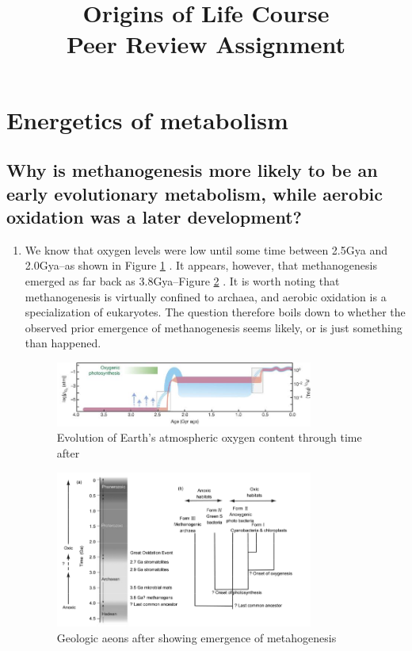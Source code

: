 \documentclass[]{article}
\title{
	Origins of Life Course\\
	Peer Review Assignment
}
\begin{document}
\maketitle

\tableofcontents

\section{Energetics of metabolism}

\subsection{
	Why is methanogenesis more likely to be an early evolutionary metabolism, while aerobic oxidation was a later development?
}

\begin{enumerate}
	\item We know that oxygen levels were low until some time between 2.5Gya and 2.0Gya--as shown in Figure \ref{fig:nature13068-f1} \cite{lyons2014rise}.  It appears, however, that methanogenesis emerged as far back as 3.8Gya--Figure \ref{fig:nisbet2011evolution} \cite{nisbet2011evolution}. It is worth noting that methanogenesis is virtually confined to archaea\cite{angel2012methanogenic}, and aerobic oxidation is a specialization of eukaryotes. The question therefore boils down to whether the observed prior emergence of methanogenesis seems likely, or is just something than happened.
	\begin{figure}[H]
		\caption{Evolution of Earth’s atmospheric oxygen content through time after \cite{lyons2014rise} }\label{fig:nature13068-f1}
		\includegraphics[width=0.8\textwidth]{nature13068-f1}
	\end{figure}
	
	\begin{figure}[H]
		\caption{Geologic aeons after \cite{nisbet2011evolution} showing emergence of metahogenesis}\label{fig:nisbet2011evolution}
		\includegraphics[width=0.8\textwidth]{nisbet2011evolution}
	\end{figure}
	

\end{enumerate}
\end{document}
